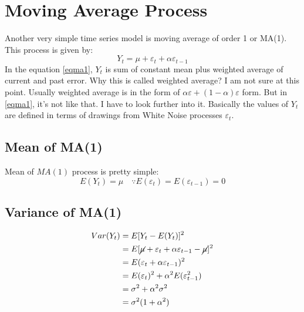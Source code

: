 \documentclass{book}
\begin{document}
\section{Moving Average Process}
Another very simple time series model is moving average of order 1 or MA(1). This process is given by:
			\begin{equation}
				Y_t=\mu+\varepsilon_t+\alpha \varepsilon_{t-1}
				\label{eqma1}
			\end{equation}
			In the equation \eqref{eqma1}, $Y_t$ is sum of constant mean plus weighted average of current and past error. Why this is called weighted average? I am not sure at this point. Usually weighted average is in the form of $\alpha \varepsilon+(1-\alpha) \varepsilon$ form. But in \eqref{eqma1}, it's not like that. I have to look further into it. Basically the values of $Y_t$ are defined in terms of drawings from White Noise processes $\varepsilon_t$. 
\subsection{Mean of MA(1)}
Mean of $MA(1)$ process is pretty simple: 
		\begin{equation}
			E(Y_t)=\mu \quad \because E(\varepsilon_t)=E(\varepsilon_{t-1})=0
			\label{eqmma}
		\end{equation}
\subsection{Variance of MA(1)}
		\begin{equation}
			\begin{split}
				Var(Y_t) & =E[Y_t-E(Y_t)]^2\\
				& =E[\cancel{\mu}+\varepsilon_t+\alpha \varepsilon_{t-1}-\cancel{\mu}]^2\\
				& =E(\varepsilon_t+\alpha \varepsilon_{t-1})^2\\
				& =E(\varepsilon_t)^2+\alpha^2 E(\varepsilon_{t-1}^2)\\
				& =\sigma^2+\alpha^2 \sigma^2\\ 
				& =\sigma^2(1+\alpha^2)
			\end{split}
			\label{}
		\end{equation}
\end{document}
